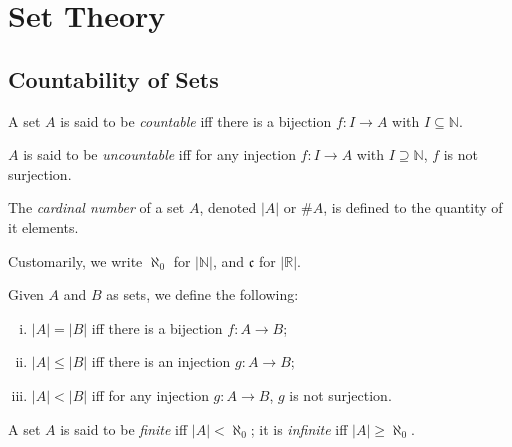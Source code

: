 \chapter{Set Theory}


\section{Countability of Sets}


\begin{definition}
    \label{def: countability}
    A set $A$ is said to be \textit{countable} iff there is a bijection $f: I \to A$ with $I \subseteq \mathbb N$.
    
    $A$ is said to be \textit{uncountable} iff for any injection $f: I \to A$ with $I \supseteq \mathbb N$, $f$ is not surjection.
\end{definition}


\begin{definition}
    \label{def: cardinal number}
    The \textit{cardinal number} of a set $A$, denoted $|A|$ or $\#A$, is defined to the quantity of it elements.

    Customarily, we write $\aleph_0$ for $|\mathbb N|$, and $\mathfrak{c}$ for $|\mathbb R|$.
\end{definition}


\begin{definition}
    \label{def: comparing cardinal number}
    Given $A$ and $B$ as sets, we define the following:
    \begin{enumerate}[(i)]
        \item $|A| = |B|$ iff there is a bijection $f: A \to B$;
        \item $|A| \le |B|$ iff there is an injection $g: A \to B$;
        \item $|A| < |B|$ iff for any injection $g: A \to B$, $g$ is not surjection.
    \end{enumerate}
\end{definition}


\begin{definition}
    \label{def: finite and infinite sets}
    A set $A$ is said to be \textit{finite} iff $|A| < \aleph_0$; it is \textit{infinite} iff $|A| \ge \aleph_0$.
\end{definition}


